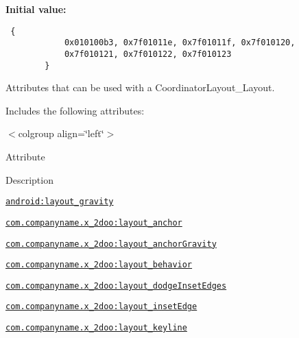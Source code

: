 \textbf{Initial value:}

\begin{Code}\begin{verbatim} {
            0x010100b3, 0x7f01011e, 0x7f01011f, 0x7f010120,
            0x7f010121, 0x7f010122, 0x7f010123
        }
\end{verbatim}
\end{Code}
Attributes that can be used with a CoordinatorLayout\_\-Layout. 

Includes the following attributes: \begin{TabularC}{0}
\hline
\end{TabularC}
$<$colgroup align=\char`\"{}left\char`\"{}$>$ 

Attribute

Description 

{\tt \hyperlink{classandroid_1_1support_1_1v4_1_1_r_1_1styleable_65760d32d26a5a8a75ef8cc2e6386db7}{android:layout\_\-gravity}}

{\tt \hyperlink{classandroid_1_1support_1_1v4_1_1_r_1_1styleable_b35a32b00f117fac198051858264bb36}{com.companyname.x\_\-2doo:layout\_\-anchor}}

{\tt \hyperlink{classandroid_1_1support_1_1v4_1_1_r_1_1styleable_f6e5589929bcbc99b0bcbeb23e048b95}{com.companyname.x\_\-2doo:layout\_\-anchorGravity}}

{\tt \hyperlink{classandroid_1_1support_1_1v4_1_1_r_1_1styleable_982d12aa414414e1e0475e69c9587a1c}{com.companyname.x\_\-2doo:layout\_\-behavior}}

{\tt \hyperlink{classandroid_1_1support_1_1v4_1_1_r_1_1styleable_a57573ce33cb7197819b20094f59046d}{com.companyname.x\_\-2doo:layout\_\-dodgeInsetEdges}}

{\tt \hyperlink{classandroid_1_1support_1_1v4_1_1_r_1_1styleable_b928d3f0b1a126bfb85b144df1690720}{com.companyname.x\_\-2doo:layout\_\-insetEdge}}

{\tt \hyperlink{classandroid_1_1support_1_1v4_1_1_r_1_1styleable_b7235d7fb22787830b44526e15a68fe4}{com.companyname.x\_\-2doo:layout\_\-keyline}}

